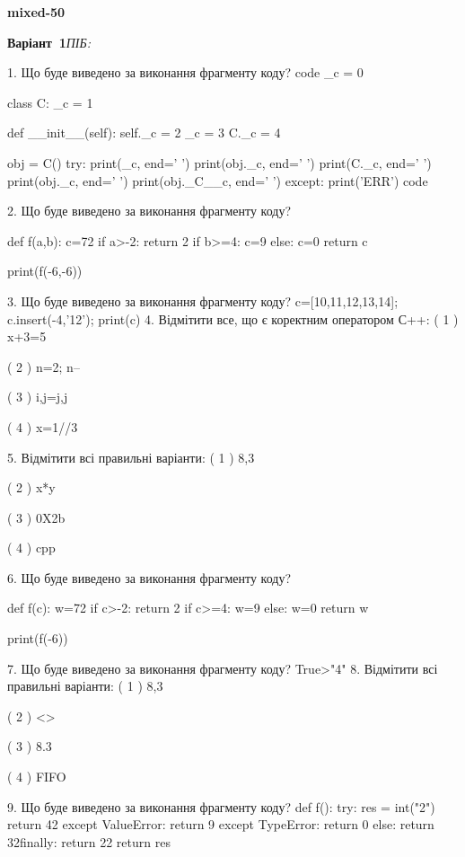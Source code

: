 \documentclass[11pt]{article}
\begin{document}
{\large\textbf{mixed-50}}

\textbf{Варіант \No\,1}\hfill \textit{ПІБ:}\,\underline{\hspace{60mm}}
\vspace{4mm}

1. Що буде виведено за виконання фрагменту коду?
code
_c = 0

class C:
    _c = 1
    
    def __init__(self):
        self._c = 2
        _c = 3
        C._c = 4

obj = C()
try:
    print(_c, end=' ')
    print(obj._c, end=' ')
    print(C._c, end=' ')
    print(obj._c, end=' ')
    print(obj._C__c, end=' ')
except:
    print('ERR')
code

2. Що буде виведено за виконання фрагменту коду?

def f(a,b):
    c=72
    if a>-2:
        return 2
    if b>=4:
         c=9
    else: 
        c=0
    return c

print(f(-6,-6))

3. Що буде виведено за виконання фрагменту коду?
c=[10,11,12,13,14]; c.insert(-4,'12'); print(c)
4. Відмітити все, що є коректним оператором С++:
( 1 ) x+3=5

( 2 ) n=2; n--

( 3 ) i,j=j,j

( 4 ) x=1//3

5. Відмітити всі правильні варіанти:
( 1 ) 8,3

( 2 ) x*y

( 3 ) 0X2b

( 4 ) cpp

6. Що буде виведено за виконання фрагменту коду?

def f(c):
    w=72
    if c>-2: 
        return 2
    if c>=4:
         w=9
    else:
         w=0
    return w

print(f(-6))

7. Що буде виведено за виконання фрагменту коду?
True>"4"
8. Відмітити всі правильні варіанти:
( 1 ) 8,3

( 2 ) <>

( 3 ) 8.3

( 4 ) FIFO

9. Що буде виведено за виконання фрагменту коду?
def f():
    try:
        res = int("2")
return 42    except ValueError: return 9
    except TypeError: return 0
else: return 32finally: return 22    return res
\end{document}
